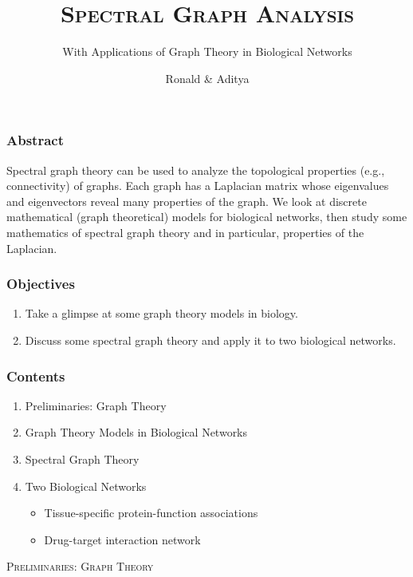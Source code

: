\documentclass[aspectratio=43,leqno]{beamer}
\title{\textsc{Spectral Graph Analysis}}
\subtitle{With Applications of Graph Theory in Biological Networks}
\author{Ronald \& Aditya}
\institute{IISER Mohali}
\begin{document}
\begin{frame}
  \titlepage
\end{frame}

\begin{frame}
  \frametitle{Abstract}
  Spectral graph theory can be used to analyze the topological properties (e.g., connectivity) of graphs. Each graph has a Laplacian matrix whose eigenvalues and eigenvectors reveal many properties of the graph. We look at discrete mathematical (graph theoretical) models for biological networks, then study some mathematics of spectral graph theory and in particular, properties of the Laplacian.
\end{frame}

\begin{frame}
  \frametitle{Objectives}
\begin{enumerate}
\item\label{item:1} Take a glimpse at some graph theory models in biology. \pause
\item\label{item:2} Discuss some spectral graph theory and apply it to two biological networks.
\end{enumerate}
\end{frame}

\begin{frame}
  \frametitle{Contents}
\begin{enumerate}
\item Preliminaries: Graph Theory \pause
\item Graph Theory Models in Biological Networks \pause
\item Spectral Graph Theory \pause
\item Two Biological Networks
\begin{itemize}
\item Tissue-specific protein-function associations 
\item Drug-target interaction network
\end{itemize}
\end{enumerate}
\end{frame}


\begin{frame}
  \vfill
\begin{center}
  \textsc{Preliminaries: Graph Theory}
\end{center}
  \vfill
\end{frame}
\end{document}
